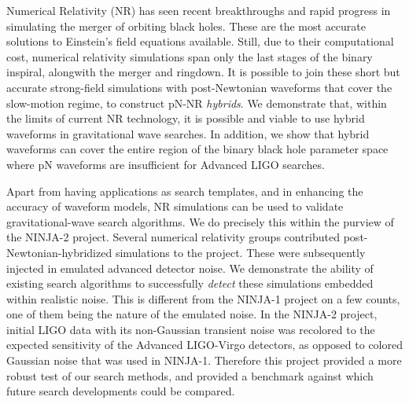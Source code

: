 Numerical Relativity (NR) has seen recent breakthroughs and rapid progress
in simulating the merger of orbiting black holes. These are the most 
accurate solutions to Einstein's field equations available. Still, 
due to their computational cost, numerical relativity simulations 
span only the last stages of the binary inspiral, alongwith the merger
and ringdown. It is possible to join these short but accurate strong-field
simulations with post-Newtonian waveforms that cover the slow-motion
regime, to construct pN-NR {\it hybrids}. We demonstrate that, within 
the limits of current NR technology, it is possible and viable to use 
hybrid waveforms in gravitational wave searches. In addition, we show
that hybrid waveforms can cover the entire region of the binary black
hole parameter space where pN waveforms are insufficient for Advanced 
LIGO searches.


Apart from having applications as search templates, and in enhancing the
accuracy of waveform models, NR simulations
can be used to validate gravitational-wave search algorithms.
We do precisely this within the purview of the NINJA-2 project. 
Several numerical relativity groups contributed
post-Newtonian-hybridized simulations to the project. These were subsequently
injected in emulated advanced detector noise. We demonstrate the ability of
existing search algorithms to successfully {\it detect} these simulations
embedded within realistic noise. This is different from the NINJA-1 project
on a few counts, one of them being the nature of the emulated noise. In the 
NINJA-2 project, initial LIGO data with its non-Gaussian transient noise was
recolored to the expected sensitivity of the Advanced LIGO-Virgo detectors, as
opposed to colored Gaussian noise that was used in NINJA-1. 
Therefore this project provided a more robust test of our search methods, and 
provided a benchmark against which future search developments could be compared.


